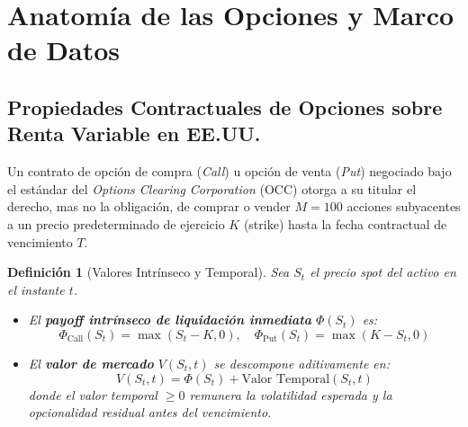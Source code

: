 \documentclass[11pt,a4paper]{article}
\newtheorem{definition}[theorem]{Definición}
\begin{document}
\newpage
\section{Anatomía de las Opciones y Marco de Datos}

\subsection{Propiedades Contractuales de Opciones sobre Renta Variable en EE.UU.}
Un contrato de opción de compra (\textit{Call}) u opción de venta (\textit{Put}) negociado bajo el estándar del \textit{Options Clearing Corporation} (OCC) otorga a su titular el derecho, mas no la obligación, de comprar o vender $M = 100$ acciones subyacentes a un precio predeterminado de ejercicio $K$ (strike) hasta la fecha contractual de vencimiento $T$.

\begin{definition}[Valores Intrínseco y Temporal]
Sea $S_t$ el precio spot del activo en el instante $t$.
\begin{itemize}
    \item El \textbf{payoff intrínseco de liquidación inmediata} $\Phi(S_t)$ es:
    \begin{equation}
        \Phi_{\text{Call}}(S_t) = \max(S_t - K, 0), \quad \Phi_{\text{Put}}(S_t) = \max(K - S_t, 0)
    \end{equation}
    \item El \textbf{valor de mercado} $V(S_t, t)$ se descompone aditivamente en:
    \begin{equation}
        V(S_t, t) = \Phi(S_t) + \text{Valor Temporal}(S_t, t)
    \end{equation}
    donde el valor temporal $\ge 0$ remunera la volatilidad esperada y la opcionalidad residual antes del vencimiento.
\end{itemize}
\end{definition}
\end{document}
